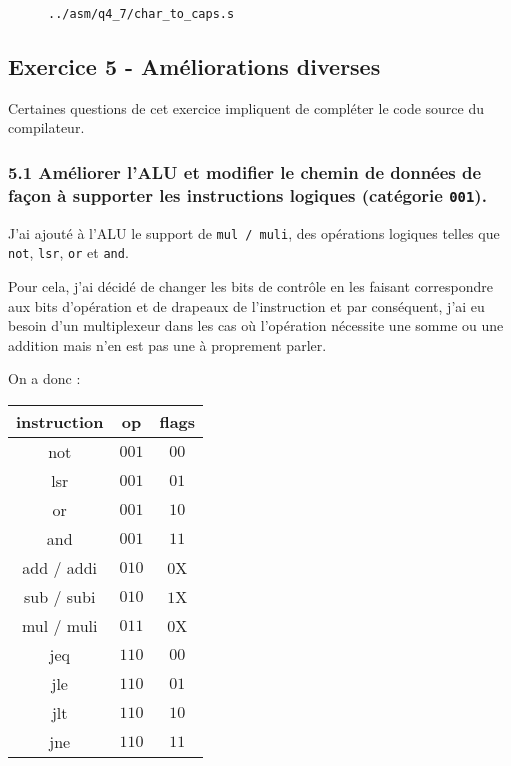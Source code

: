\documentclass[twoside, 12pt, a4paper]{article}
\newcommand{\fm}[2]{
\begin{figure}[!h]
    \centering
    \inputminted[]{asm}{#1}
    \caption{\texttt{#2}}
\end{figure}
}
\begin{document}
\fm{../asm/q4_7/char_to_caps.s}{../asm/q4\_7/char\_to\_caps.s}
                
        \clearpage

        \subsection{Exercice 5 - Améliorations diverses}

Certaines questions de cet exercice impliquent de compléter le code source du compilateur.

        \subsubsection*{\textbf{5.1} Améliorer l'ALU et modifier le chemin de données de façon à supporter les instructions logiques (catégorie \texttt{001}).}

        J'ai ajouté à l'ALU le support de \texttt{mul / muli}, des opérations logiques telles que \texttt{not}, \texttt{lsr}, \texttt{or} et \texttt{and}.

        Pour cela, j'ai décidé de changer les bits de contrôle en les faisant correspondre aux bits d'opération et de drapeaux de l'instruction et par conséquent, j'ai eu besoin d'un multiplexeur dans les cas où l'opération nécessite une somme ou une addition mais n'en est pas une à proprement parler.

        On a donc :
        \begin{center}
            
        \ttfamily
        \begin{tabular}{|c|c|c|}
             \hline
             instruction & op & flags\\
             \hline
             not & $001$ & $00$\\
             lsr & $001$ & $01$\\
             or  & $001$ & $10$\\
             and & $001$ & $11$\\
             \hline
             add / addi & $010$ & $0$X\\
             sub / subi & $010$ &$1$X\\
             \hline
             mul / muli & $011$ & $0$X\\
             \hline
             jeq & $110$ & $00$\\
             jle & $110$ & $01$\\
             jlt & $110$ & $10$\\
             jne & $110$ & $11$\\
             \hline
        \end{tabular}

        \end{center}
        
\end{document}
